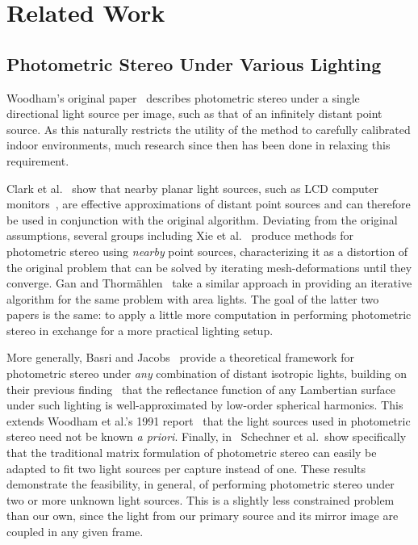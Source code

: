 \section{Related Work}\label{sec:relatedwork}
\subsection{Photometric Stereo Under Various Lighting}
Woodham's original paper~\cite{woodham1979} describes photometric stereo under
a single directional light source per image, such as that of an infinitely
distant point source. As this naturally restricts the utility of the method to
carefully calibrated indoor environments, much research since then has been
done in relaxing this requirement.

Clark et al.~\cite{clark2006} show that nearby planar light sources, such as
LCD computer monitors~\cite{clark2010}, are effective approximations of distant
point sources and can therefore be used in conjunction with the original
algorithm. Deviating from the original assumptions, several groups including
Xie et al.~\cite{xie} produce methods for photometric stereo using
\emph{nearby} point sources, characterizing it as a distortion of the original
problem that can be solved by iterating mesh-deformations until they converge.
Gan and Thorm\"{a}hlen~\cite{gan} take a similar approach in providing an
iterative algorithm for the same problem with area lights. The goal of the
latter two papers is the same: to apply a little more computation in performing
photometric stereo in exchange for a more practical lighting setup.

More generally, Basri and Jacobs~\cite{basri2001-12} provide a theoretical
framework for photometric stereo under \emph{any} combination of distant
isotropic lights, building on their previous finding~\cite{basri2001-07} that
the reflectance function of any Lambertian surface under such lighting is
well-approximated by low-order spherical harmonics. This extends Woodham et
al.'s 1991 report~\cite{woodham1991} that the light sources used in photometric
stereo need not be known \textit{a priori}. Finally, in~\cite{schechner}
Schechner et al.\ show specifically that the traditional matrix formulation of
photometric stereo can easily be adapted to fit two light sources per capture
instead of one. These results demonstrate the feasibility, in general, of
performing photometric stereo under two or more unknown light sources. This is
a slightly less constrained problem than our own, since the light from our
primary source and its mirror image are coupled in any given frame.
